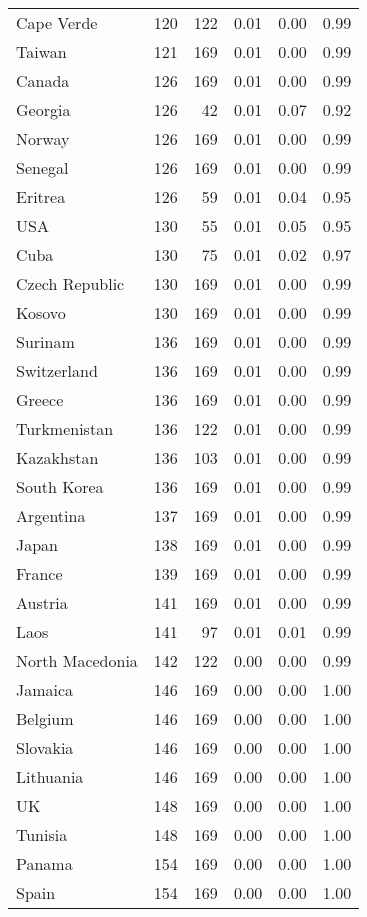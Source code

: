 \begin{longtable}[t]{lrrrrr}
Cape Verde & 120 & 122 & 0.01 & 0.00 & 0.99\\
\addlinespace
Taiwan & 121 & 169 & 0.01 & 0.00 & 0.99\\
Canada & 126 & 169 & 0.01 & 0.00 & 0.99\\
Georgia & 126 & 42 & 0.01 & 0.07 & 0.92\\
Norway & 126 & 169 & 0.01 & 0.00 & 0.99\\
Senegal & 126 & 169 & 0.01 & 0.00 & 0.99\\
\addlinespace
Eritrea & 126 & 59 & 0.01 & 0.04 & 0.95\\
USA & 130 & 55 & 0.01 & 0.05 & 0.95\\
Cuba & 130 & 75 & 0.01 & 0.02 & 0.97\\
Czech Republic & 130 & 169 & 0.01 & 0.00 & 0.99\\
Kosovo & 130 & 169 & 0.01 & 0.00 & 0.99\\
\addlinespace
Surinam & 136 & 169 & 0.01 & 0.00 & 0.99\\
Switzerland & 136 & 169 & 0.01 & 0.00 & 0.99\\
Greece & 136 & 169 & 0.01 & 0.00 & 0.99\\
Turkmenistan & 136 & 122 & 0.01 & 0.00 & 0.99\\
Kazakhstan & 136 & 103 & 0.01 & 0.00 & 0.99\\
\addlinespace
South Korea & 136 & 169 & 0.01 & 0.00 & 0.99\\
Argentina & 137 & 169 & 0.01 & 0.00 & 0.99\\
Japan & 138 & 169 & 0.01 & 0.00 & 0.99\\
France & 139 & 169 & 0.01 & 0.00 & 0.99\\
Austria & 141 & 169 & 0.01 & 0.00 & 0.99\\
\addlinespace
Laos & 141 & 97 & 0.01 & 0.01 & 0.99\\
North Macedonia & 142 & 122 & 0.00 & 0.00 & 0.99\\
Jamaica & 146 & 169 & 0.00 & 0.00 & 1.00\\
Belgium & 146 & 169 & 0.00 & 0.00 & 1.00\\
Slovakia & 146 & 169 & 0.00 & 0.00 & 1.00\\
\addlinespace
Lithuania & 146 & 169 & 0.00 & 0.00 & 1.00\\
UK & 148 & 169 & 0.00 & 0.00 & 1.00\\
Tunisia & 148 & 169 & 0.00 & 0.00 & 1.00\\
Panama & 154 & 169 & 0.00 & 0.00 & 1.00\\
Spain & 154 & 169 & 0.00 & 0.00 & 1.00\\

\end{longtable}
